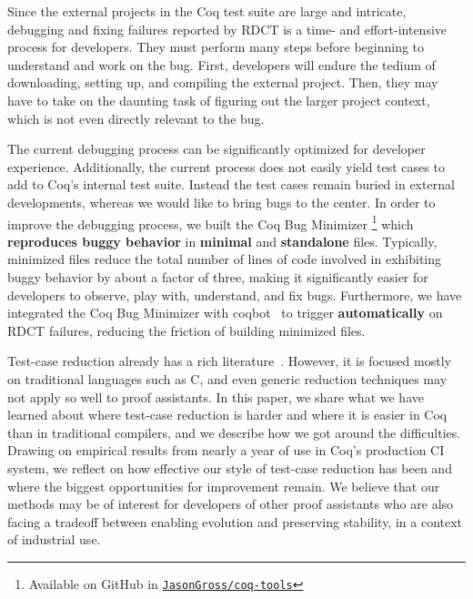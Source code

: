 \documentclass[a4paper,USenglish,cleveref,autoref,thm-restate,pdfa]{lipics-v2021}
\begin{document}
Since the external projects in the Coq test suite are large and intricate, debugging and fixing failures reported by RDCT is a time- and effort-intensive process for developers.
They must perform many steps before beginning to understand and work on the bug.
First, developers will endure the tedium of downloading, setting up, and compiling the external project.
Then, they may have to take on the daunting task of figuring out the larger project context, which is not even directly relevant to the bug.

The current debugging process can be significantly optimized for developer experience.
Additionally, the current process does not easily yield test cases to add to Coq's internal test suite.
Instead the test cases remain buried in external developments, whereas we would like to bring bugs to the center.
In order to improve the debugging process, we built the Coq Bug Minimizer%
\footnote{%
Available on GitHub in \href{https://github.com/JasonGross/coq-tools}{\texttt{JasonGross/coq-tools}}%
}
which \textbf{reproduces buggy behavior} in \textbf{minimal} and \textbf{standalone} files.
Typically, minimized files reduce the total number of lines of code involved in exhibiting buggy behavior by about a factor of three, making it significantly easier for developers to observe, play with, understand, and fix bugs.
Furthermore, we have integrated the Coq Bug Minimizer with coqbot~\cite{zimmermann:hal-03479327} to trigger \textbf{automatically} on RDCT failures, reducing the friction of building minimized files.

Test-case reduction already has a rich literature~\cite{chen_survey_compiler_testing}. However, it is focused mostly on traditional languages such as C, and even generic reduction techniques may not apply so well to proof assistants.
%
In this paper, we share what we have learned about where test-case reduction is harder and where it is easier in Coq than in traditional compilers, and we describe how we got around the difficulties.
Drawing on empirical results from nearly a year of use in Coq's production CI system, we reflect on how effective our style of test-case reduction has been and where the biggest opportunities for improvement remain.
We believe that our methods may be of interest for developers of other proof assistants who are also facing a tradeoff between enabling evolution and preserving stability, in a context of industrial use.
\end{document}
